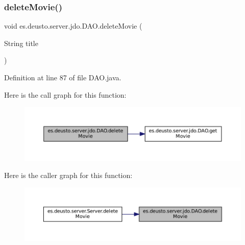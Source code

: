 \subsubsection{\texorpdfstring{deleteMovie()}{deleteMovie()}\hspace{0.1cm}{\footnotesize\ttfamily [1/2]}}
{\footnotesize\ttfamily void es.\+deusto.\+server.\+jdo.\+D\+A\+O.\+delete\+Movie (\begin{DoxyParamCaption}\item[{String}]{title }\end{DoxyParamCaption})}



Definition at line 87 of file D\+A\+O.\+java.

Here is the call graph for this function\+:
\nopagebreak
\begin{figure}[H]
\begin{center}
\leavevmode
\includegraphics[width=350pt]{classes_1_1deusto_1_1server_1_1jdo_1_1_d_a_o_a9bcf552682ef562673a7c725d003debf_cgraph}
\end{center}
\end{figure}
Here is the caller graph for this function\+:
\nopagebreak
\begin{figure}[H]
\begin{center}
\leavevmode
\includegraphics[width=350pt]{classes_1_1deusto_1_1server_1_1jdo_1_1_d_a_o_a9bcf552682ef562673a7c725d003debf_icgraph}
\end{center}
\end{figure}
\mbox{\label{classes_1_1deusto_1_1server_1_1jdo_1_1_d_a_o_a479ca9a8597aada4e74445699140e0fd}} 
